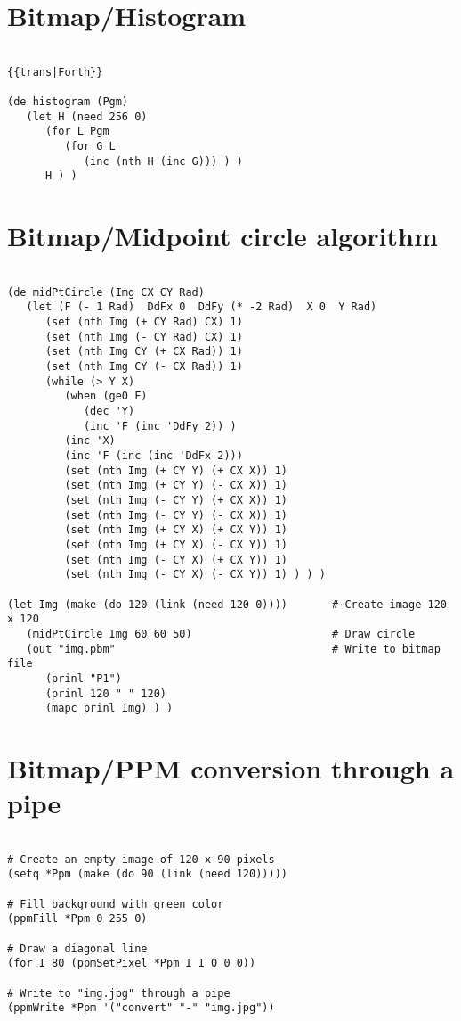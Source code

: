 \section*{Bitmap/Histogram}

\begin{verbatim}

{{trans|Forth}}

(de histogram (Pgm)
   (let H (need 256 0)
      (for L Pgm
         (for G L
            (inc (nth H (inc G))) ) )
      H ) )

\end{verbatim}

\section*{Bitmap/Midpoint circle algorithm}

\begin{verbatim}

(de midPtCircle (Img CX CY Rad)
   (let (F (- 1 Rad)  DdFx 0  DdFy (* -2 Rad)  X 0  Y Rad)
      (set (nth Img (+ CY Rad) CX) 1)
      (set (nth Img (- CY Rad) CX) 1)
      (set (nth Img CY (+ CX Rad)) 1)
      (set (nth Img CY (- CX Rad)) 1)
      (while (> Y X)
         (when (ge0 F)
            (dec 'Y)
            (inc 'F (inc 'DdFy 2)) )
         (inc 'X)
         (inc 'F (inc (inc 'DdFx 2)))
         (set (nth Img (+ CY Y) (+ CX X)) 1)
         (set (nth Img (+ CY Y) (- CX X)) 1)
         (set (nth Img (- CY Y) (+ CX X)) 1)
         (set (nth Img (- CY Y) (- CX X)) 1)
         (set (nth Img (+ CY X) (+ CX Y)) 1)
         (set (nth Img (+ CY X) (- CX Y)) 1)
         (set (nth Img (- CY X) (+ CX Y)) 1)
         (set (nth Img (- CY X) (- CX Y)) 1) ) ) )

(let Img (make (do 120 (link (need 120 0))))       # Create image 120 x 120
   (midPtCircle Img 60 60 50)                      # Draw circle
   (out "img.pbm"                                  # Write to bitmap file
      (prinl "P1")
      (prinl 120 " " 120)
      (mapc prinl Img) ) )

\end{verbatim}

\section*{Bitmap/PPM conversion through a pipe}

\begin{verbatim}

# Create an empty image of 120 x 90 pixels
(setq *Ppm (make (do 90 (link (need 120)))))

# Fill background with green color
(ppmFill *Ppm 0 255 0)

# Draw a diagonal line
(for I 80 (ppmSetPixel *Ppm I I 0 0 0))

# Write to "img.jpg" through a pipe
(ppmWrite *Ppm '("convert" "-" "img.jpg"))

\end{verbatim}

